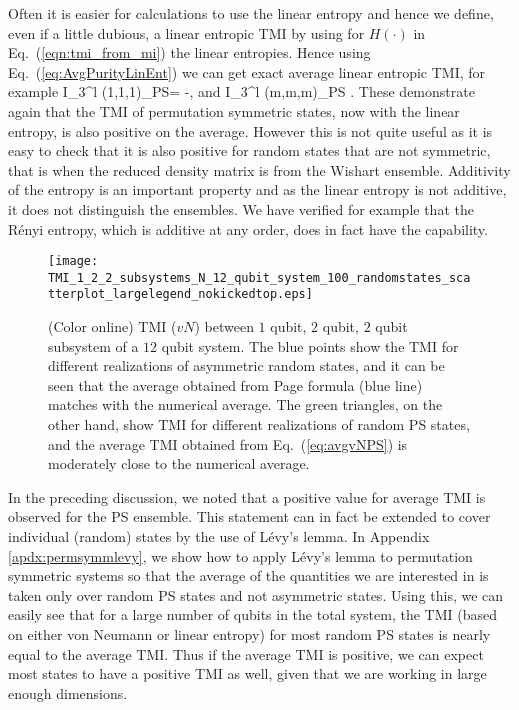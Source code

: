 \documentclass[pre,aps,showpacs,showkeys,twocolumn]{revtex4-1}
\theoremstyle{definition}
\theoremstyle{remark}
\begin{document}
Often it is easier for calculations to use the linear entropy and hence we define, even if a little dubious, a linear entropic TMI by using for $H(\cdot)$ in Eq.~(\ref{eqn:tmi_from_mi}) the linear entropies. Hence using Eq.~(\ref{eq:AvgPurityLinEnt}) we can get exact average  linear entropic TMI, for example
\beq
\label{eq:avglinTMI-PS1}
\left \br  I_3^l  (1,1,1)\right \kt_{PS}= \approx {}-,
\eeq
and 
\beq
\label{eq:avglinTMI-PSm}
\left \br  I_3^l  (m,m,m)\right \kt_{PS} \approx {}.
\eeq
These demonstrate again that the TMI of permutation symmetric states, now with the linear entropy, is also positive on the average.
However this is not quite useful as it is easy to check that it is also positive for random states that are not symmetric, that is when the reduced density matrix is from the Wishart ensemble. Additivity of the entropy is an important property and as the linear entropy is not additive, it does not distinguish the ensembles. We have verified for example that the R\'enyi entropy, which is additive at any order, does in fact have the capability.

\begin{figure}[!htpb]
    \texttt{[image: TMI\_1\_2\_2\_subsystems\_N\_12\_qubit\_system\_100\_randomstates\_scatterplot\_largelegend\_nokickedtop.eps]}
    \caption{(Color online) TMI ($vN$) between $1$ qubit, $2$ qubit, $2$ qubit subsystem of a $12$ qubit system. The blue points show the TMI for different realizations of asymmetric random states, and it can be seen that the average obtained from Page formula (blue line) matches with the numerical average. The green triangles, on the other hand, show TMI for different realizations of random PS states, and the average TMI obtained from Eq.~(\ref{eq:avgvNPS}) is moderately close to the numerical average.}
    \label{fig:tmi_HS_PS_randomstates}
\end{figure}

In the preceding discussion, we noted that a positive value for average TMI is observed for the PS ensemble. This statement can in fact be extended to cover individual (random) states by the use of L\'evy's lemma. In Appendix \ref{apdx:permsymmlevy}, we show how to apply L\'evy's lemma to permutation symmetric systems so that the average of the quantities we are interested in is taken only over random PS states and not asymmetric states. Using this, we can easily see that for a large number of qubits in the total system, the TMI (based on either von Neumann or linear entropy) for most random PS states is nearly equal to the average TMI. Thus if the average TMI is positive, we can expect most states to have a positive TMI as well, given that we are working in large enough dimensions.
\end{document}

